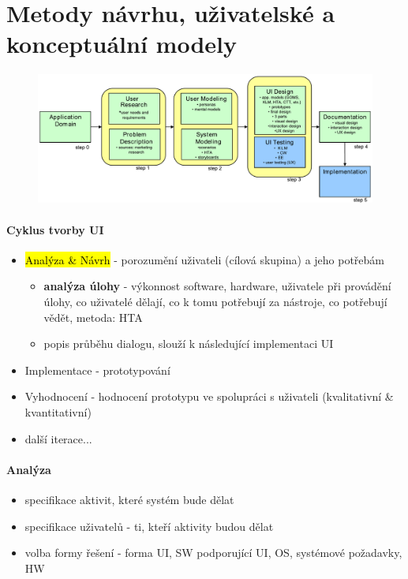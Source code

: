 \section[NUR - Metody návrhu, uživatelské a konceptuální modely]{Metody návrhu, uživatelské a konceptuální modely}

\begin{figure}[h!]
\centering
\includegraphics[width=125mm]{04/images/hci}
\end{figure}

\paragraph{Cyklus tvorby UI}
\begin{itemize}[itemsep=0px]
\item \hl{Analýza \& Návrh} - porozumění uživateli (cílová skupina) a jeho potřebám
\begin{itemize}[itemsep=0px]
\item \textbf{analýza úlohy} - výkonnost software, hardware, uživatele při provádění úlohy, co uživatelé dělají, co k tomu potřebují za nástroje, co potřebují vědět, metoda: HTA
\item popis průběhu dialogu, slouží k následující implementaci UI
\end{itemize}
\item Implementace - prototypování
\item Vyhodnocení - hodnocení prototypu ve spolupráci s uživateli (kvalitativní \&
kvantitativní)
\item další iterace...
\end{itemize}

\paragraph{Analýza}
\begin{itemize}[itemsep=0px]
\item specifikace aktivit, které systém bude dělat
\item specifikace uživatelů - ti, kteří aktivity budou dělat
\item volba formy řešení - forma UI, SW podporující UI, OS, systémové požadavky, HW
\end{itemize}

